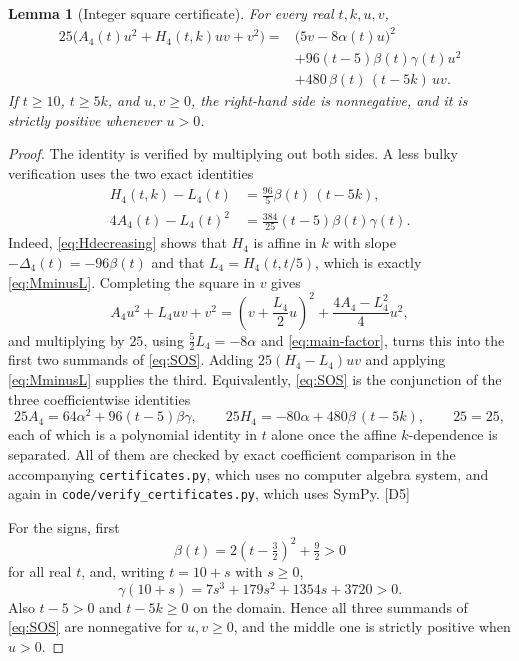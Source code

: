 \documentclass[11pt,a4paper]{article}
\numberwithin{equation}{section}
\newtheorem{lemma}[lemma]{Lemma}
\theoremstyle{definition}
\theoremstyle{remark}
\newcommand{\dup}[1]{{\small\textsf{\color{MutedInk}[#1]}}}
\begin{document}
\begin{lemma}[Integer square certificate]\label{lem:certificate}
For every real $t,k,u,v$,
\begin{equation}\label{eq:SOS}
\boxed{\begin{aligned}
 25\bigl(A_4(t)u^2+H_4(t,k)uv+v^2\bigr)
  ={}&\bigl(5v-8\alpha(t)u\bigr)^2\\
    &+96(t-5)\beta(t)\gamma(t)u^2\\
    &+480\,\beta(t)\,(t-5k)\,uv.
\end{aligned}}
\end{equation}
If $t\ge10$, $t\ge5k$, and $u,v\ge0$, the right-hand side is nonnegative,
and it is strictly positive whenever $u>0$.
\end{lemma}
\begin{proof}
The identity is verified by multiplying out both sides. A less bulky
verification uses the two exact identities
\begin{align}
 H_4(t,k)-L_4(t)&=\frac{96}{5}\beta(t)\,(t-5k),\label{eq:MminusL}\\
 4A_4(t)-L_4(t)^2&=\frac{384}{25}(t-5)\beta(t)\gamma(t).
                                             \label{eq:main-factor}
\end{align}
Indeed, \eqref{eq:Hdecreasing} shows that $H_4$ is affine in $k$ with slope
$-\Delta_4(t)=-96\beta(t)$ and that $L_4=H_4(t,t/5)$, which is exactly
\eqref{eq:MminusL}. Completing the square in $v$ gives
\[
 A_4u^2+L_4uv+v^2=\left(v+\frac{L_4}2u\right)^2
   +\frac{4A_4-L_4^2}{4}u^2 ,
\]
and multiplying by $25$, using $\frac52L_4=-8\alpha$ and
\eqref{eq:main-factor}, turns this into the first two summands of
\eqref{eq:SOS}. Adding $25(H_4-L_4)uv$ and applying \eqref{eq:MminusL}
supplies the third. Equivalently, \eqref{eq:SOS} is the conjunction of the
three coefficientwise identities
\[
 25A_4=64\alpha^2+96(t-5)\beta\gamma,\qquad
 25H_4=-80\alpha+480\beta\,(t-5k),\qquad 25=25 ,
\]
each of which is a polynomial identity in $t$ alone once the affine
$k$-dependence is separated. All of them are checked by exact coefficient
comparison in the accompanying \texttt{certificates.py}, which uses no
computer algebra system, and again in \texttt{code/verify\_certificates.py},
which uses SymPy. \dup{D5}

For the signs, first
\begin{equation}\label{eq:Bpositive}
 \beta(t)=2\left(t-\tfrac32\right)^2+\tfrac92>0
\end{equation}
for all real $t$, and, writing $t=10+s$ with $s\ge0$,
\begin{equation}\label{eq:positive-cubic}
 \gamma(10+s)=7s^3+179s^2+1354s+3720>0 .
\end{equation}
Also $t-5>0$ and $t-5k\ge0$ on the domain. Hence all three summands of
\eqref{eq:SOS} are nonnegative for $u,v\ge0$, and the middle one is
strictly positive when $u>0$.
\end{proof}
\end{document}
